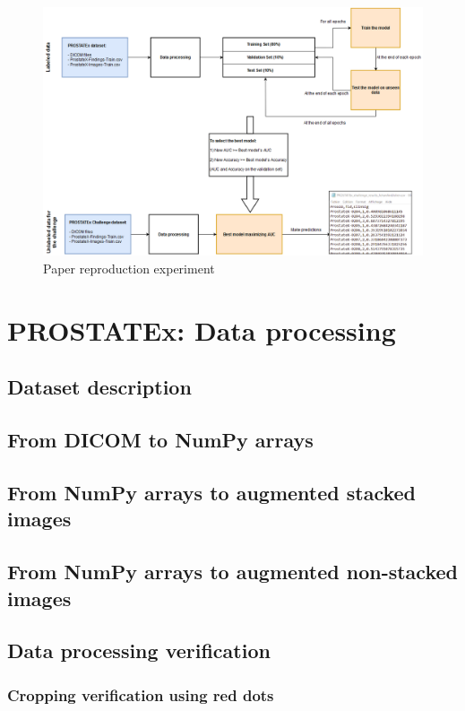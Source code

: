 \begin{figure}[!h]
\centering
\includegraphics[width=1\textwidth, keepaspectratio=true]{./figures/paper_reproduction_process.png}
\caption{Paper reproduction experiment}
\label{fig:paper_reproduction_process}
\end{figure}


\section{PROSTATEx: Data processing}
\label{prostatex_data_processing}
\subsection{Dataset description}
\label{prostatex_dataset_description}
\subsection{From DICOM to NumPy arrays}
\subsection{From NumPy arrays to augmented stacked images}
\subsection{From NumPy arrays to augmented non-stacked images}
\subsection{Data processing verification}
\subsubsection{Cropping verification using red dots}
